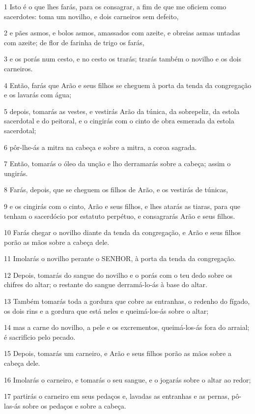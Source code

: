 \par 1 Isto é o que lhes farás, para os consagrar, a fim de que me oficiem como sacerdotes: toma um novilho, e dois carneiros sem defeito,
\par 2 e pães asmos, e bolos asmos, amassados com azeite, e obreias asmas untadas com azeite; de flor de farinha de trigo os farás,
\par 3 e os porás num cesto, e no cesto os trarás; trarás também o novilho e os dois carneiros.
\par 4 Então, farás que Arão e seus filhos se cheguem à porta da tenda da congregação e os lavarás com água;
\par 5 depois, tomarás as vestes, e vestirás Arão da túnica, da sobrepeliz, da estola sacerdotal e do peitoral, e o cingirás com o cinto de obra esmerada da estola sacerdotal;
\par 6 pôr-lhe-ás a mitra na cabeça e sobre a mitra, a coroa sagrada.
\par 7 Então, tomarás o óleo da unção e lho derramarás sobre a cabeça; assim o ungirás.
\par 8 Farás, depois, que se cheguem os filhos de Arão, e os vestirás de túnicas,
\par 9 e os cingirás com o cinto, Arão e seus filhos, e lhes atarás as tiaras, para que tenham o sacerdócio por estatuto perpétuo, e consagrarás Arão e seus filhos.
\par 10 Farás chegar o novilho diante da tenda da congregação, e Arão e seus filhos porão as mãos sobre a cabeça dele.
\par 11 Imolarás o novilho perante o SENHOR, à porta da tenda da congregação.
\par 12 Depois, tomarás do sangue do novilho e o porás com o teu dedo sobre os chifres do altar; o restante do sangue derramá-lo-ás à base do altar.
\par 13 Também tomarás toda a gordura que cobre as entranhas, o redenho do fígado, os dois rins e a gordura que está neles e queimá-los-ás sobre o altar;
\par 14 mas a carne do novilho, a pele e os excrementos, queimá-los-ás fora do arraial; é sacrifício pelo pecado.
\par 15 Depois, tomarás um carneiro, e Arão e seus filhos porão as mãos sobre a cabeça dele.
\par 16 Imolarás o carneiro, e tomarás o seu sangue, e o jogarás sobre o altar ao redor;
\par 17 partirás o carneiro em seus pedaços e, lavadas as entranhas e as pernas, pô-las-ás sobre os pedaços e sobre a cabeça.
